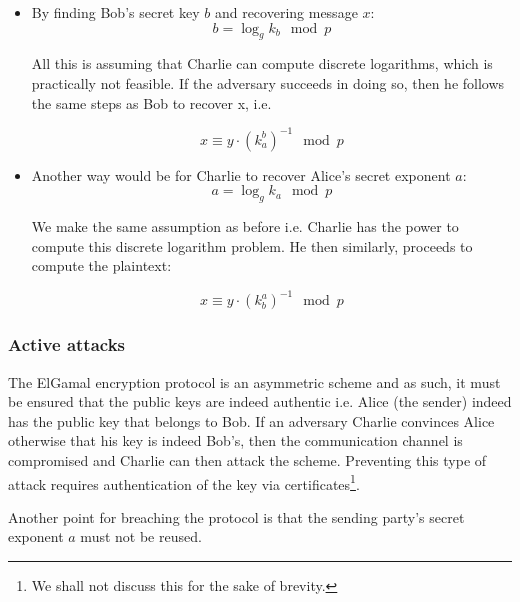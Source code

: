 \begin{itemize}
    \item By finding Bob's secret key \( b \) and recovering message \( x \):
        \begin{equation}
            b = \log_g k_b \mod p
        \end{equation}

        All this is assuming that Charlie can compute discrete logarithms, which is practically not feasible. 
        If the adversary succeeds in doing so, then he follows the same steps as Bob to recover x, i.e.

        \begin{equation}
            x \equiv y \cdot (k_a^b)^{-1} \mod p
        \end{equation}
        
    \item Another way would be for Charlie to recover Alice's secret exponent \( a \):
        \begin{equation}
            a = \log_g k_a \mod p
        \end{equation}
        
        We make the same assumption as before i.e. Charlie has the power to compute this discrete logarithm problem.
        He then similarly, proceeds to compute the plaintext:

        \begin{equation}
            x \equiv y \cdot (k_b^a)^{-1} \mod p     
        \end{equation}
\end{itemize}

\subsubsection{Active attacks}

The ElGamal encryption protocol is an asymmetric scheme and as such, it must be ensured that the public keys are indeed authentic i.e. Alice (the sender) indeed has the public key that belongs to Bob.
If an adversary Charlie convinces Alice otherwise that his key is indeed Bob's, then the communication channel is compromised and Charlie can then attack the scheme.
Preventing this type of attack requires authentication of the key via certificates\footnote{We shall not discuss this for the sake of brevity.}.

Another point for breaching the protocol is that the sending party's secret exponent \( a \) must not be reused.
